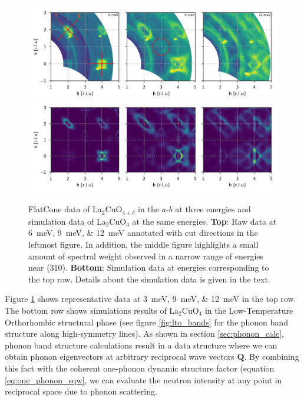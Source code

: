 \begin{figure}
    \includegraphics[width=\textwidth]{fig/lowen/flatcone_colorplots.png}
    \includegraphics[width=\textwidth]{fig/lowen/simulation_colorplots.png}
    \caption[Flatcone raw inelastic]{FlatCone data of La$_2$CuO$_{4+\delta}$ in the $a$-$b$ at three energies and simulation data of La$_2$CuO$_{4}$ at the same energies. \textbf{Top}: Raw data at \SIlist{6;9;12}{\milli\eV} annotated with cut directions in the leftmost figure. In addition, the middle figure highlights a small amount of spectral weight observed in a narrow range of energies near (310). \textbf{Bottom}: Simulation data at energies corresponding to the top row. Details about the simulation data is given in the text.}
    \label{fig:flatcone_raw_inelastic}
\end{figure}

Figure \ref{fig:flatcone_raw_inelastic} shows representative data at \SIlist{3;9;12}{\milli\eV} in the top row. The bottom row shows simulations results of La$_2$CuO$_4$ in the Low-Temperature Orthorhombic structural phase (see figure \ref{fig:lto_bands} for the phonon band structure along high-symmetry lines). As shown in section \ref{sec:phonon_calc}, phonon band structure calculations result in a data structure where we can obtain phonon eigenvectors at arbitrary reciprocal wave vectors $\bm{Q}$. By combining this fact with the coherent one-phonon dynamic structure factor (equation \eqref{eq:one_phonon_sqw}, we can evaluate the neutron intensity at any point in reciprocal space due to phonon scattering.

